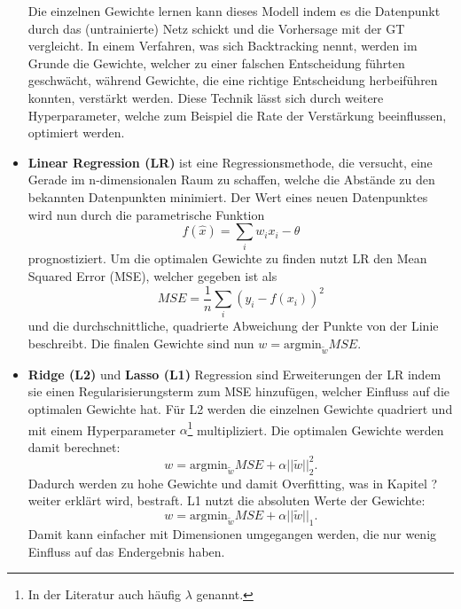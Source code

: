 \begin{itemize}
    Die einzelnen Gewichte lernen kann dieses Modell indem es die Datenpunkt durch das (untrainierte) Netz
    schickt und die Vorhersage mit der GT vergleicht. In einem Verfahren, was sich Backtracking nennt, werden
    im Grunde die Gewichte, welcher zu einer falschen Entscheidung führten geschwächt, während Gewichte, die
    eine richtige Entscheidung herbeiführen konnten, verstärkt werden. Diese Technik lässt sich durch weitere
    Hyperparameter, welche zum Beispiel die Rate der Verstärkung beeinflussen, optimiert werden.

   \item \textbf{Linear Regression (LR)} ist eine Regressionsmethode, die versucht, eine Gerade im
    n-dimensionalen Raum zu schaffen, welche die Abstände zu den bekannten Datenpunkten minimiert. Der
    Wert eines neuen Datenpunktes wird nun durch die parametrische Funktion
    \begin{equation}
        f(\hat{x}) = \sum_i w_ix_i - \theta
    \end{equation}
    prognostiziert. Um die optimalen Gewichte zu finden nutzt LR den Mean
    Squared Error (MSE), welcher gegeben ist als
    \begin{equation}
        MSE = \frac{1}{n} \sum_i(y_i-f(x_i))^2
    \end{equation}
    und die durchschnittliche, quadrierte Abweichung der Punkte von der Linie beschreibt. Die finalen
    Gewichte sind nun $w = \text{argmin}_{\tilde{w}} MSE$.

   \item \textbf{Ridge (L2)} und \textbf{Lasso (L1)} Regression sind Erweiterungen der LR indem sie einen
    Regularisierungsterm zum MSE hinzufügen, welcher Einfluss auf die optimalen Gewichte hat. Für L2 werden
    die einzelnen Gewichte quadriert und mit einem Hyperparameter $\alpha$\footnote{In der Literatur auch
    häufig $\lambda$ genannt.} multipliziert. Die optimalen Gewichte werden
    damit berechnet: 
    \begin{equation}
        w = \text{argmin}_{\tilde{w}} MSE + \alpha||\tilde{w}||_2^2.
    \end{equation}
    Dadurch werden zu hohe Gewichte und damit Overfitting, was in Kapitel ? weiter erklärt wird, bestraft.
    L1 nutzt die absoluten Werte der Gewichte:
    \begin{equation}
        w = \text{argmin}_{\tilde{w}} MSE + \alpha||\tilde{w}||_1.
    \end{equation}
    Damit kann einfacher mit Dimensionen umgegangen werden, die nur wenig Einfluss auf das Endergebnis haben.

\end{itemize}

